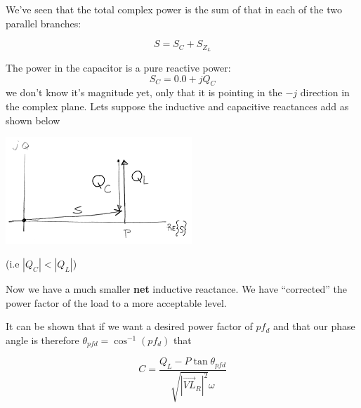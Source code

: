 We've seen that the total complex
power is the sum of that in each of the two parallel branches:

\[
S = S_C + S_{Z_L}
\]

The power in the capacitor is a pure reactive power:
\[
S_C = 0.0 + j Q_C
\]
we don't know it's magnitude yet, only that it is pointing in the $-j$ direction
in the complex plane.   Lets suppose the inductive and capacitive reactances add
as shown below

\includegraphics[width=70mm]{figsChapt03/MF77903.png}

(i.e $|Q_C| < |Q_L|$)

Now we have a much smaller {\bf net} inductive reactance.   We have ``corrected''
the power factor of the load to a more acceptable level.

It can be shown that  if we want a desired power factor of $pf_d$ and that our phase
angle is therefore $\theta_{pfd} = \cos^{-1}(pf_d)$ that

\[
C = \frac{Q_L - P \tan \theta_{pfd}}{\sqrt{|\vec{VL}_R|^2} \omega}
\]
%
%
%
%
%
%
%
%
%
%
%
%
%
%
%

%


